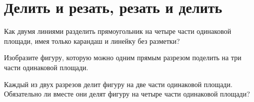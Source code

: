 \section{Делить и резать, резать и делить}
\begin{itemize}

\itA Как двумя линиями разделить прямоугольник на четыре части одинаковой площади, имея только карандаш и линейку без разметки?

\itB Изобразите фигуру, которую можно одним прямым разрезом поделить на три части одинаковой площади.

\itC Каждый из двух разрезов делит фигуру на две части одинаковой площади. Обязательно ли вместе они делят фигуру на четыре части одинаковой площади?
\end{itemize}